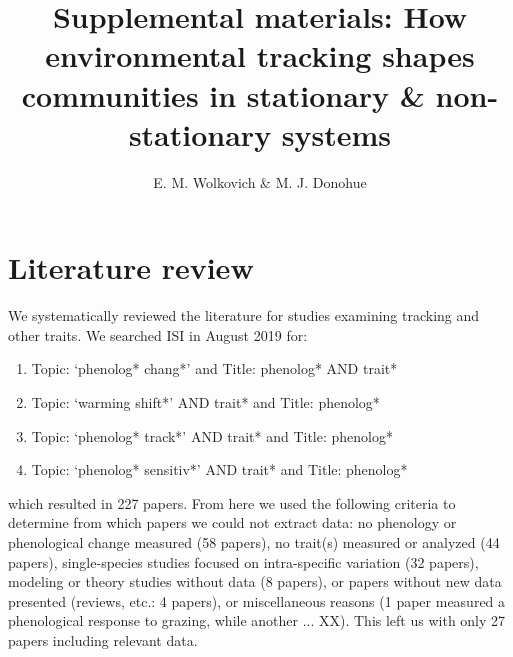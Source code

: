 \documentclass[11pt,letter]{article}
\begin{document}

\renewcommand{\refname}{\CHead{}}

\title{Supplemental materials:  How environmental tracking shapes communities in stationary \& non-stationary systems} 

\author{E. M. Wolkovich \& M. J. Donohue}
\date{} 
\maketitle  %

\section{Literature review}
We systematically reviewed the literature for studies examining tracking and other traits. We searched ISI in August 2019 for:
\begin{enumerate}
\item Topic: `phenolog* chang*' and Title: phenolog* AND trait*
\item Topic: `warming shift*' AND trait* and Title: phenolog*
\item Topic: `phenolog* track*' AND trait* and Title: phenolog*
\item Topic: `phenolog* sensitiv*' AND trait* and Title: phenolog*
\end{enumerate}
which resulted in 227 papers. From here we used the following criteria to determine from which papers we could not extract data: no phenology or phenological change measured (58 papers), no trait(s) measured or analyzed (44 papers), single-species studies focused on intra-specific variation (32 papers), modeling or theory studies without data (8 papers), or papers without new data presented (reviews, etc.: 4 papers), or miscellaneous reasons (1 paper measured a phenological response to grazing, while another ... XX). This left us with only 27 papers including relevant data. 

\end{document}
